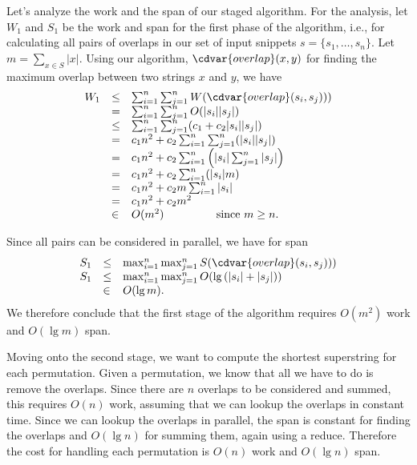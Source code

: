 \begin{cluster}
\label{grp:grm:genome::cost-analysis}

\begin{gram}
\label{grm:genome::cost-analysis}
Let's analyze the work and the span of our staged algorithm.
For the analysis, let $W_1$ and $S_1$ be the work and span for the
first phase of the algorithm, i.e., for calculating all pairs of
overlaps in our set of input snippets $s = \{s_1, \ldots, s_n \}$.
Let $m = \sum_{x \in S} |x|$.
Using our algorithm, $\cdvar{overlap}(x,y)$ for finding the maximum overlap
between two strings $x$ and $y$, we have
\[
\begin{array}{lll}
W_{1} & \leq & \sum_{i=1}^{n}\sum_{j=1}^{n} W(\cdvar{overlap}(s_i,s_j)))\\
  & = & \sum_{i=1}^{n}\sum_{j=1}^{n} O(|s_i| |s_j|)\\
  & \leq & \sum_{i=1}^{n}\sum_{j=1}^{n} (c_1 + c_2 |s_i| |s_j|)\\
  & =    & c_1 n^2 + c_2 \sum_{i=1}^{n}\sum_{j=1}^{n} (|s_i| |s_j|)\\
  & =    & c_1 n^2 + c_2 \sum_{i=1}^{n} \left(|s_i| \sum_{j=1}^{n} |s_j|\right)\\
  & =    & c_1 n^2 + c_2 \sum_{i=1}^{n} (|s_i| m) \\
  & =    & c_1 n^2 + c_2 m \sum_{i=1}^{n} |s_i| \\
  & =    & c_1 n^2 + c_2 m^2\\
  & \in  & O(m^2)  ~~~~~~~~~~~~~~\mbox{since } m \geq n.
\end{array}
\]

Since all pairs can be considered in parallel, we have for span
\[
\begin{array}{lll}
S_{1} & \leq & \max_{i=1}^{n}\max_{j=1}^{n} S(\cdvar{overlap}(s_i,s_j)))
\\
S_{1} & \leq & \max_{i=1}^{n}\max_{j=1}^{n} O(\lg{(|s_i| + |s_j|)})
\\
     & \in  & O(\lg m).
\end{array}
\]
We therefore conclude that the first stage of the algorithm requires
$O(m^2)$ work and $O(\lg{m})$ span.

Moving onto the second stage, we want to compute the shortest
superstring for each permutation.
Given a permutation, we know that all we have to do is remove the
overlaps.
Since there are $n$ overlaps to be considered and summed, this
requires $O(n)$ work, assuming that we can lookup the overlaps in
constant time.
Since we can lookup the overlaps in parallel, the span is constant for
finding the overlaps and $O(\lg{n})$ for summing them, again using a reduce.
Therefore the cost for handling each permutation is $O(n)$ work and
$O(\lg{n})$ span.



\end{gram}
\end{cluster}

